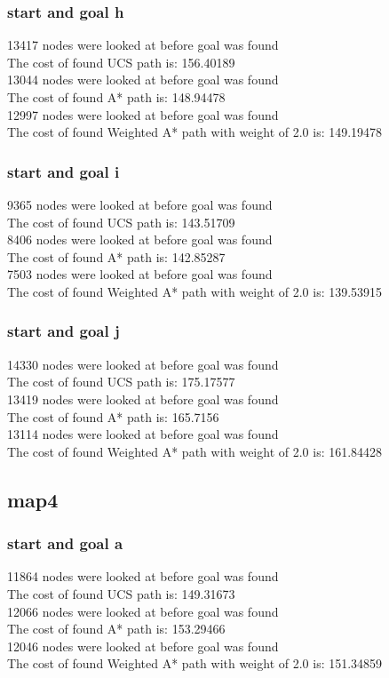 \documentclass[11pt]{article} %
\begin{document}
\subsubsection{start and goal h}
13417 nodes were looked at before goal was found\\
The cost of found UCS path is: 156.40189\\
13044 nodes were looked at before goal was found\\
The cost of found A* path is: 148.94478\\
12997 nodes were looked at before goal was found\\
The cost of found Weighted A* path with weight of 2.0 is: 149.19478\\
\subsubsection{start and goal i}
9365 nodes were looked at before goal was found\\
The cost of found UCS path is: 143.51709\\
8406 nodes were looked at before goal was found\\
The cost of found A* path is: 142.85287\\
7503 nodes were looked at before goal was found\\
The cost of found Weighted A* path with weight of 2.0 is: 139.53915\\
\subsubsection{start and goal j}
14330 nodes were looked at before goal was found\\
The cost of found UCS path is: 175.17577\\
13419 nodes were looked at before goal was found\\
The cost of found A* path is: 165.7156\\
13114 nodes were looked at before goal was found\\
The cost of found Weighted A* path with weight of 2.0 is: 161.84428\\

\subsection{map4}
\subsubsection{start and goal a}
11864 nodes were looked at before goal was found\\
The cost of found UCS path is: 149.31673\\
12066 nodes were looked at before goal was found\\
The cost of found A* path is: 153.29466\\
12046 nodes were looked at before goal was found\\
The cost of found Weighted A* path with weight of 2.0 is: 151.34859\\
\end{document}
